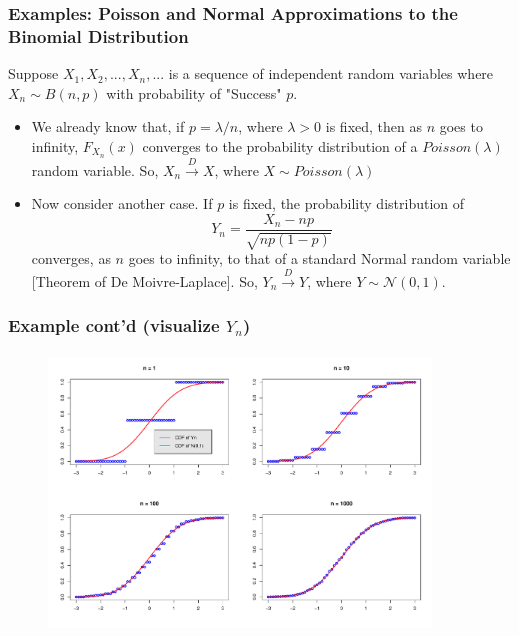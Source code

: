 \documentclass[notes=show,smaller,handout]{beamer}
\newenvironment{stepitemize}{\begin{itemize}[<+->]}{\end{itemize} }
\begin{document}
\begin{frame}%

\frametitle{Examples: Poisson and Normal Approximations to the Binomial Distribution}

\begin{example}
Suppose $X_{1},X_{2},...,X_{n},...$ is a sequence of independent
random variables where $X_n\sim B(n,p)$ with probability of "Success" $p$.\bigskip

\begin{stepitemize}

\item We already know that, if $p=\lambda/n$, where $\lambda>0$ is fixed, then as $n$ goes to infinity, $F_{X_{n}}\left( x\right) $ converges to 
the probability distribution of a \color{blue}$Poisson\left( \lambda \right) $ \color{black} random variable. So, $X_{n}\overset{D}{\rightarrow }X$, where $X\sim Poisson\left(\lambda \right) $\bigskip

\item Now consider another case. If $p$ is fixed, the probability distribution of
\begin{equation*}
Y_{n}=\frac{X_{n}-np}{\sqrt{np\left( 1-p\right) }}
\end{equation*}
converges, as $n$ goes to infinity, to that of a \color{blue}standard Normal \color{black} random variable [Theorem of De Moivre-Laplace]. So, $Y_
{n}\overset{D}{\rightarrow }Y$, where $Y\sim \mathcal{N}\left(0,1\right) $.

\end{stepitemize}
\end{example}
\end{frame}%

\begin{frame}%

\frametitle{Example cont'd (visualize $Y_{n}$)}

\begin{example}


\begin{figure}[ptb]\centering
\includegraphics[height=2.9in, width=4in]{CDF_Rplot.pdf}%
\end{figure}%



\end{example}
\end{frame}%
\end{document}

